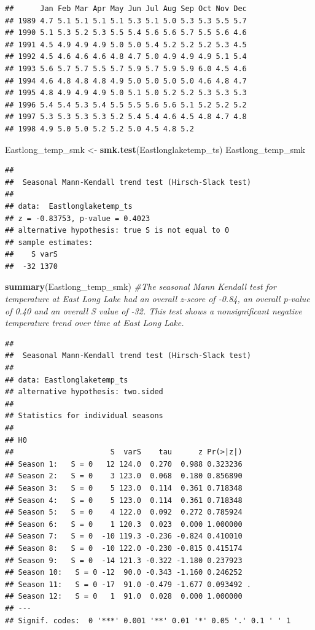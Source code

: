 \documentclass[12pt,]{article}
\newenvironment{Shaded}{\begin{snugshade}}{\end{snugshade}}
\newcommand{\KeywordTok}[1]{\textcolor[rgb]{0.13,0.29,0.53}{\textbf{#1}}}
\newcommand{\StringTok}[1]{\textcolor[rgb]{0.31,0.60,0.02}{#1}}
\newcommand{\CommentTok}[1]{\textcolor[rgb]{0.56,0.35,0.01}{\textit{#1}}}
\newcommand{\NormalTok}[1]{#1}
\begin{document}
\begin{verbatim}
##      Jan Feb Mar Apr May Jun Jul Aug Sep Oct Nov Dec
## 1989 4.7 5.1 5.1 5.1 5.1 5.3 5.1 5.0 5.3 5.3 5.5 5.7
## 1990 5.1 5.3 5.2 5.3 5.5 5.4 5.6 5.6 5.7 5.5 5.6 4.6
## 1991 4.5 4.9 4.9 4.9 5.0 5.0 5.4 5.2 5.2 5.2 5.3 4.5
## 1992 4.5 4.6 4.6 4.6 4.8 4.7 5.0 4.9 4.9 4.9 5.1 5.4
## 1993 5.6 5.7 5.7 5.5 5.7 5.9 5.7 5.9 5.9 6.0 4.5 4.6
## 1994 4.6 4.8 4.8 4.8 4.9 5.0 5.0 5.0 5.0 4.6 4.8 4.7
## 1995 4.8 4.9 4.9 4.9 5.0 5.1 5.0 5.2 5.2 5.3 5.3 5.3
## 1996 5.4 5.4 5.3 5.4 5.5 5.5 5.6 5.6 5.1 5.2 5.2 5.2
## 1997 5.3 5.3 5.3 5.3 5.2 5.4 5.4 4.6 4.5 4.8 4.7 4.8
## 1998 4.9 5.0 5.0 5.2 5.2 5.0 4.5 4.8 5.2
\end{verbatim}

\begin{Shaded}
\begin{Highlighting}[]
\NormalTok{Eastlong_temp_smk <-}\StringTok{ }\KeywordTok{smk.test}\NormalTok{(Eastlonglaketemp_ts)}
\NormalTok{Eastlong_temp_smk}
\end{Highlighting}
\end{Shaded}

\begin{verbatim}
## 
##  Seasonal Mann-Kendall trend test (Hirsch-Slack test)
## 
## data:  Eastlonglaketemp_ts
## z = -0.83753, p-value = 0.4023
## alternative hypothesis: true S is not equal to 0
## sample estimates:
##    S varS 
##  -32 1370
\end{verbatim}

\begin{Shaded}
\begin{Highlighting}[]
\KeywordTok{summary}\NormalTok{(Eastlong_temp_smk) }\CommentTok{#The seasonal Mann Kendall test for temperature at East Long Lake had an overall z-score of -0.84, an overall p-value of 0.40 and an overall S value of -32. This test shows a nonsignificant negative temperature trend over time at East Long Lake.}
\end{Highlighting}
\end{Shaded}

\begin{verbatim}
## 
##  Seasonal Mann-Kendall trend test (Hirsch-Slack test)
## 
## data: Eastlonglaketemp_ts
## alternative hypothesis: two.sided
## 
## Statistics for individual seasons
## 
## H0
##                      S  varS    tau      z Pr(>|z|)  
## Season 1:   S = 0   12 124.0  0.270  0.988 0.323236  
## Season 2:   S = 0    3 123.0  0.068  0.180 0.856890  
## Season 3:   S = 0    5 123.0  0.114  0.361 0.718348  
## Season 4:   S = 0    5 123.0  0.114  0.361 0.718348  
## Season 5:   S = 0    4 122.0  0.092  0.272 0.785924  
## Season 6:   S = 0    1 120.3  0.023  0.000 1.000000  
## Season 7:   S = 0  -10 119.3 -0.236 -0.824 0.410010  
## Season 8:   S = 0  -10 122.0 -0.230 -0.815 0.415174  
## Season 9:   S = 0  -14 121.3 -0.322 -1.180 0.237923  
## Season 10:   S = 0 -12  90.0 -0.343 -1.160 0.246252  
## Season 11:   S = 0 -17  91.0 -0.479 -1.677 0.093492 .
## Season 12:   S = 0   1  91.0  0.028  0.000 1.000000  
## ---
## Signif. codes:  0 '***' 0.001 '**' 0.01 '*' 0.05 '.' 0.1 ' ' 1
\end{verbatim}
\end{document}
